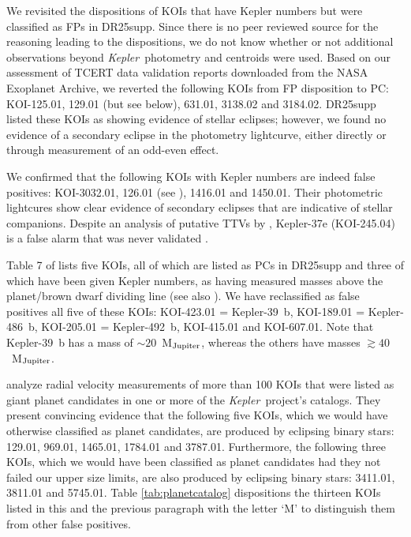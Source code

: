 \documentclass{aastex62}
\newcommand{\ik}{{\it Kepler~}}
\begin{document}
{We revisited the dispositions of KOIs that have Kepler numbers but were classified as FPs in DR25supp.  Since there is no peer reviewed source for the reasoning leading to the dispositions, we do not know whether or not additional observations beyond \ik photometry and centroids were used.  Based on our assessment of TCERT data validation reports downloaded from the NASA Exoplanet Archive, we reverted the following KOIs from FP disposition to PC: KOI-125.01, 129.01 (but see below), 631.01, 3138.02 and 3184.02.  DR25supp listed these KOIs as showing evidence of stellar eclipses; however, we found no evidence of a secondary eclipse in the photometry lightcurve, either directly or through measurement of an odd-even effect.

We confirmed that the following KOIs with Kepler numbers are indeed false positives: KOI-3032.01, 126.01 (see \citealt{Carter:2011}), 1416.01 and 1450.01.  Their photometric lightcures show clear evidence of secondary eclipses that are indicative of stellar companions.  Despite an analysis of putative TTVs by \cite{Hadden:2014}, Kepler-37e (KOI-245.04) is a false alarm that was never validated \citep{Barclay:2013}. 

Table 7 of \cite{Carmichael:2019} lists five KOIs, all of which are listed as PCs in DR25supp and three of which have been given Kepler numbers, as having measured masses above the planet/brown dwarf dividing line  (see also \citealt{Carmichael:2023}). We have reclassified as false positives all five of these KOIs: KOI-423.01 = Kepler-39~b, KOI-189.01 = Kepler-486~b, KOI-205.01 = Kepler-492~b,  KOI-415.01 and KOI-607.01. Note that Kepler-39~b has a mass of $\sim 20$~M$_{\rm Jupiter}$, whereas the others have masses $\gtrsim 40$~M$_{\rm Jupiter}$.

\cite{Santerne:2016} analyze radial velocity measurements of more than 100 KOIs that were listed as giant planet candidates in one or more of the \ik project's catalogs. They present convincing evidence that the following five KOIs, which we would have otherwise classified as planet candidates, are produced by eclipsing binary stars: 129.01, 969.01, 1465.01, 1784.01 and 3787.01. Furthermore, the following three KOIs, which we would have been classified as planet candidates had they not failed our upper size limits, are also produced by eclipsing binary stars: 
3411.01, 3811.01 and 5745.01. Table \ref{tab:planetcatalog} dispositions the thirteen KOIs listed in this and the previous paragraph with the letter `M' to distinguish them from other false positives.}
\end{document}
